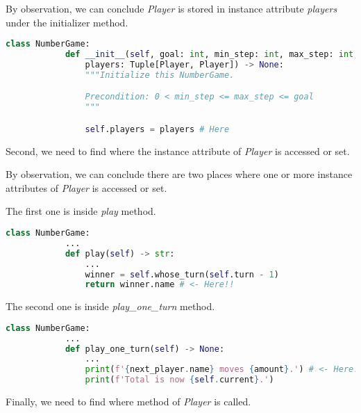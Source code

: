 \documentclass[12pt]{article}
\begin{document}
\begin{enumerate}[1.]
\begin{itemize}
        \bigskip

        By observation, we can conclude \textit{Player} is stored in
        instance attribute \textit{players} under the initializer method.

        \begin{lstlisting}[language=Python]
        class NumberGame:
            def __init__(self, goal: int, min_step: int, max_step: int,
                players: Tuple[Player, Player]) -> None:
                """Initialize this NumberGame.

                Precondition: 0 < min_step <= max_step <= goal
                """

                self.players = players # Here
        \end{lstlisting}

        \bigskip

        Second, we need to find where the instance attribute of \textit{Player} is accessed or set.

        \bigskip

        By observation, we can conclude there are two places where one or more instance
        attributes of \textit{Player} is accessed or set.

        \bigskip

        The first one is inside \textit{play} method.

        \begin{lstlisting}[language=Python]
        class NumberGame:
            ...
            def play(self) -> str:
                ...
                winner = self.whose_turn(self.turn - 1)
                return winner.name # <- Here!!
        \end{lstlisting}

        \bigskip

        The second one is inside \textit{play\_one\_turn} method.

        \begin{lstlisting}[language=Python]
        class NumberGame:
            ...
            def play_one_turn(self) -> None:
                ...
                print(f'{next_player.name} moves {amount}.') # <- Here!!
                print(f'Total is now {self.current}.')
        \end{lstlisting}

        \bigskip

        Finally, we need to find where method of \textit{Player} is
        called.


\end{itemize}
\end{enumerate}
\end{document}
